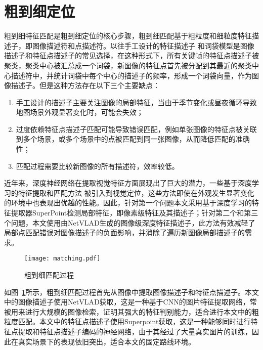 \section{粗到细定位}

粗到细特征匹配是粗到细定位的核心步骤，粗到细匹配基于粗粒度和细粒度特征描述子，即图像描述符和点描述符。以往手工设计的特征描述子 \cite{lowe2004distinctive, rublee2011orb, bay2008speeded}和词袋模型是图像描述子和特征点描述子的常见选择，在这种形式下，所有关键帧的特征点描述子被聚类，聚类中心被汇总成一个词袋，新图像的特征点首先被分配到其最近的聚类中心描述符中，并统计词袋中每个中心的描述子的频率，形成一个词袋向量，作为图像描述子。但是这种方法存在以下三个主要缺点：
\begin{enumerate}
  \item 手工设计的描述子主要关注图像的局部特征，当由于季节变化或昼夜循环导致地图场景外观显著变化时，可能会失效；
  \item 过度依赖特征点描述子匹配可能导致错误匹配，例如单张图像的特征点被关联到多个场景，或多个场景中的点被匹配到同一张图像，从而降低匹配的准确性；
  \item 匹配过程需要比较新图像的所有描述符，效率较低。
\end{enumerate}

近年来，深度神经网络在提取视觉特征方面展现出了巨大的潜力，一些基于深度学习的特征提取和匹配方法 \cite{detone2018superpoint, arandjelovic2016netvlad, sarlin2020superglue} 被引入到视觉定位，这些方法即使在外观发生显著变化的环境中也表现出优越的性能。因此，针对第一个问题本文采用基于深度学习的特征提取器SuperPoint\cite{detone2018superpoint}检测局部特征，即像素级特征及其描述子；针对第二个和第三个问题，本文使用由NetVLAD\cite{arandjelovic2016netvlad}生成的图像级深度特征描述子，此方法有效减轻了局部点匹配错误对图像描述子的负面影响，并消除了遍历新图像局部描述子的需求。

\begin{figure}
  \centering
  \texttt{[image: matching.pdf]}
  \caption{粗到细匹配过程}
  \label{fig:matching}
\end{figure}

如图~\ref{fig:matching}所示，粗到细匹配过程首先从图像中提取图像描述子和特征点描述子。本文中的图像描述子使用NetVLAD\cite{arandjelovic2016netvlad}获取，这是一种基于CNN的图片特征提取网络，常被用来进行大规模的图像检索，证明其强大的特征判别能力，适合进行本文中的粗粒度匹配。本文中的特征点描述子使用Superpoint\cite{detone2018superpoint}获取，这是一种能够同时进行特征点提取和特征点描述子编码的神经网络，由于其经过了大量真实图片的训练，因此在真实场景下的表现依旧突出，适合本文的固定路线环境。

